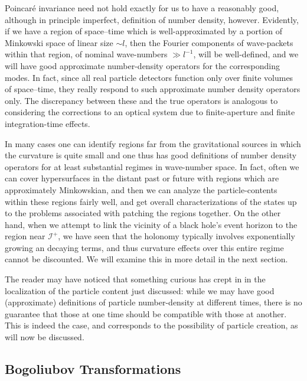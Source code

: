 \documentclass[
%
draft    %
,numberedheadings 
,bibliocites
  ]
  {aipproc}
\newcommand{\scrif}{{{\mathscr I}^{+}}}
\begin{document}
Poincar\'e invariance need not hold exactly for us to have a reasonably good, although in principle imperfect, definition of number density, however.  Evidently, if we have a region of space--time which is well-approximated by a portion of Minkowski space of linear size $\sim l$, then the Fourier components of wave-packets within that region, of nominal wave-numbers $\gg l^{-1}$, will be well-defined, and we will have good approximate number-density operators for the corresponding modes.  In fact, since all real particle detectors function only over finite volumes of space--time, they really respond to such approximate number density operators only.  The discrepancy between these and the true operators is analogous to considering the corrections to an optical system due to finite-aperture and finite integration-time effects.

In many cases one can identify regions far from the gravitational sources in which the curvature is quite small and one thus has good definitions of number density operators for at least substantial regimes in wave-number space.  In fact, often we can cover hypersurfaces in the distant past or future with regions which are approximately Minkowskian, and then we can analyze the particle-contents within these regions fairly well, and get overall characterizations of the states up to the problems associated with patching the regions together.
On the other hand, when we attempt to link the vicinity of a black hole's event horizon to the region near $\scrif$, we have seen that the holonomy typically involves exponentially growing an decaying terms, and thus curvature effects over this entire regime cannot be discounted.  We will examine this in more detail in the next section.

The reader may have noticed that something curious has crept in in the localization of the particle content just discussed:  while we may have good (approximate) definitions of particle number-density at different times, there is no guarantee that those at one time should be compatible with those at another.  This is indeed the case, and corresponds to the possibility of particle creation, as will now be discussed.

\subsection{Bogoliubov Transformations}\label{BTsec}
\end{document}
